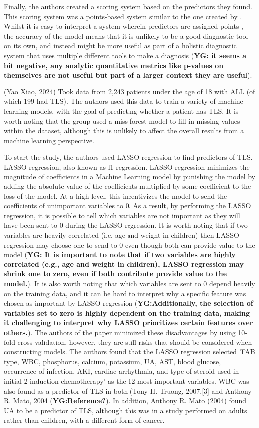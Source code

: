 \documentclass{article}
\begin{document}
Finally, the authors created a scoring system based on the predictors they found. This scoring system was a points-based system similar to the one created by \cite{mato2004predictive}. Whilst it is easy to interpret a system wherein predictors are assigned points , the accuracy of the model means that it is unlikely to be a good diagnostic tool on its own, and instead might be more useful as part of a holistic diagnostic system that uses multiple different tools to make a diagnosis (\textbf{YG: it seems a bit negative,  any analytic quantitative metrics like p-values on themselves are not useful but part of a larger context they are useful}).

(Yao Xiao, 2024) Took data from 2,243 patients under the age of 18 with ALL (of which 199 had TLS). The authors used this data to train a variety of machine learning models, with the goal of predicting whether a patient has TLS. It is worth noting that the group used a miss-forest model to fill in missing values within the dataset, although this is unlikely to affect the overall results from a machine learning perspective.

To start the study, the authors used LASSO regression to find predictors of TLS. LASSO regression, also known as l1 regression. LASSO regression minimizes the magnitude of coefficients in a Machine Learning model by punishing the model by adding the absolute value of the coefficients multiplied by some coefficient to the loss of the model. At a high level, this incentivizes the model to send the coefficients of unimportant variables to 0. As a result, by performing the LASSO regression, it is possible to tell which variables are not important as they will have been sent to 0 during the LASSO regression. It is worth noting that if two variables are heavily correlated (i.e. age and weight in children) then LASSO regression may choose one to send to 0 even though both can provide value to the model (\textbf{YG: It is important to note that if two variables are highly correlated (e.g., age and weight in children), LASSO regression may shrink one to zero, even if both contribute provide value to the model.}). It is also worth noting that which variables are sent to 0 depend heavily on the training data, and it can be hard to interpret why a specific feature was chosen as important by LASSO regression (\textbf{YG:Additionally, the selection of variables set to zero is highly dependent on the training data, making it challenging to interpret why LASSO prioritizes certain features over others.}). The authors of the paper minimized these disadvantages by using 10-fold cross-validation, however, they are still risks that should be considered when constructing models. The authors found that the LASSO regression selected 'FAB type, WBC, phosphorus, calcium, potassium, UA, AST, blood glucose, occurrence of infection, AKI, cardiac arrhythmia, and type of steroid used in initial 2 induction chemotherapy' as the 12 most important variables. WBC was also found as a predictor of TLS in both (Tony H. Truong, 2007,[3] and Anthony R. Mato, 2004 (\textbf{YG:Reference?}). In addition, Anthony R. Mato (2004) found UA to be a predictor of TLS, although this was in a study performed on adults rather than children, with a different form of cancer.
\end{document}
